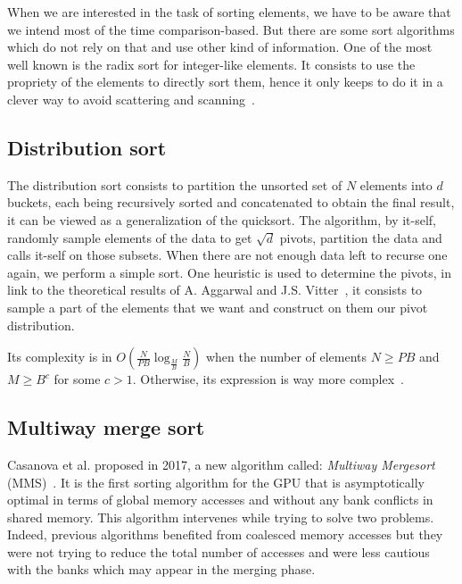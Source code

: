 
When we are interested in the task of sorting elements, we have to be aware that we intend most of the time comparison-based. But there are some sort algorithms which do not rely on that and use other kind of information. One of the most well known is the radix sort for integer-like elements. It consists to use the propriety of the elements to directly sort them, hence it only keeps to do it in a clever way to avoid scattering and scanning~\cite{satish2009designing}.

\subsection{Distribution sort}

The distribution sort consists to partition the unsorted set of $N$ elements into $d$ buckets, each being recursively sorted and concatenated to obtain the final result, it can be viewed as a generalization of the quicksort. The algorithm, by it-self, randomly sample elements of the data to get $\sqrt{d}$ pivots, partition the data and calls it-self on those subsets. When there are not enough data left to recurse one again, we perform a simple sort. One heuristic is used to determine the pivots, in link to the theoretical results of A. Aggarwal and J.S. Vitter~\cite{aggarwal1988input}, it consists to sample a part of the elements that we want and construct on them our pivot distribution.

Its complexity is in $O(\frac{N}{PB} \log_{\frac{M}{B}} \frac{N}{B})$ when the number of elements $N \geq PB$ and $M \geq B^{c}$ for some $c > 1$. Otherwise, its expression is way more complex~\cite{arge2008fundamental}.

\subsection{Multiway merge sort}

Casanova et al. proposed in 2017, a new algorithm called: \textit{Multiway Mergesort} (MMS)~\cite{casanova2017efficient}. It is the first sorting algorithm for the GPU that is asymptotically optimal in terms of global memory accesses and without any bank conflicts in shared memory. This algorithm intervenes while trying to solve two problems. Indeed, previous algorithms benefited from coalesced memory accesses but they were not trying to reduce the total number of accesses and were less cautious with the banks which may appear in the merging phase.

